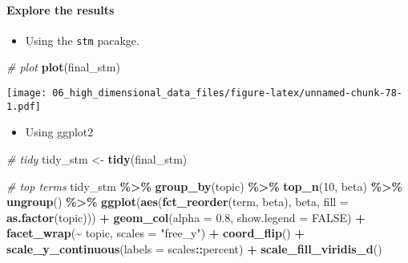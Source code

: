 \documentclass[
]{book}
\newenvironment{Shaded}{\begin{snugshade}}{\end{snugshade}}
\newcommand{\CommentTok}[1]{\textcolor[rgb]{0.56,0.35,0.01}{\textit{#1}}}
\newcommand{\DataTypeTok}[1]{\textcolor[rgb]{0.13,0.29,0.53}{#1}}
\newcommand{\DecValTok}[1]{\textcolor[rgb]{0.00,0.00,0.81}{#1}}
\newcommand{\FloatTok}[1]{\textcolor[rgb]{0.00,0.00,0.81}{#1}}
\newcommand{\KeywordTok}[1]{\textcolor[rgb]{0.13,0.29,0.53}{\textbf{#1}}}
\newcommand{\NormalTok}[1]{#1}
\newcommand{\OperatorTok}[1]{\textcolor[rgb]{0.81,0.36,0.00}{\textbf{#1}}}
\newcommand{\OtherTok}[1]{\textcolor[rgb]{0.56,0.35,0.01}{#1}}
\newcommand{\StringTok}[1]{\textcolor[rgb]{0.31,0.60,0.02}{#1}}
\providecommand{\tightlist}{%
  \setlength{\itemsep}{0pt}\setlength{\parskip}{0pt}}
\begin{document}
\hypertarget{explore-the-results}{%
\paragraph{Explore the results}\label{explore-the-results}}

\begin{itemize}
\tightlist
\item
  Using the \texttt{stm} pacakge.
\end{itemize}

\begin{Shaded}
\begin{Highlighting}[]
\CommentTok{\# plot}
\KeywordTok{plot}\NormalTok{(final\_stm)}
\end{Highlighting}
\end{Shaded}

\texttt{[image: 06\_high\_dimensional\_data\_files/figure-latex/unnamed-chunk-78-1.pdf]}

\begin{itemize}
\tightlist
\item
  Using ggplot2
\end{itemize}

\begin{Shaded}
\begin{Highlighting}[]
\CommentTok{\# tidy  }
\NormalTok{tidy\_stm \textless{}{-}}\StringTok{ }\KeywordTok{tidy}\NormalTok{(final\_stm)}

\CommentTok{\# top terms}
\NormalTok{tidy\_stm }\OperatorTok{\%\textgreater{}\%}
\StringTok{    }\KeywordTok{group\_by}\NormalTok{(topic) }\OperatorTok{\%\textgreater{}\%}
\StringTok{    }\KeywordTok{top\_n}\NormalTok{(}\DecValTok{10}\NormalTok{, beta) }\OperatorTok{\%\textgreater{}\%}
\StringTok{    }\KeywordTok{ungroup}\NormalTok{() }\OperatorTok{\%\textgreater{}\%}
\StringTok{    }\KeywordTok{ggplot}\NormalTok{(}\KeywordTok{aes}\NormalTok{(}\KeywordTok{fct\_reorder}\NormalTok{(term, beta), beta, }\DataTypeTok{fill =} \KeywordTok{as.factor}\NormalTok{(topic))) }\OperatorTok{+}
\StringTok{    }\KeywordTok{geom\_col}\NormalTok{(}\DataTypeTok{alpha =} \FloatTok{0.8}\NormalTok{, }\DataTypeTok{show.legend =} \OtherTok{FALSE}\NormalTok{) }\OperatorTok{+}
\StringTok{    }\KeywordTok{facet\_wrap}\NormalTok{(}\OperatorTok{\textasciitilde{}}\StringTok{ }\NormalTok{topic, }\DataTypeTok{scales =} \StringTok{"free\_y"}\NormalTok{) }\OperatorTok{+}
\StringTok{    }\KeywordTok{coord\_flip}\NormalTok{() }\OperatorTok{+}
\StringTok{    }\KeywordTok{scale\_y\_continuous}\NormalTok{(}\DataTypeTok{labels =}\NormalTok{ scales}\OperatorTok{::}\NormalTok{percent) }\OperatorTok{+}
\StringTok{    }\KeywordTok{scale\_fill\_viridis\_d}\NormalTok{()}
\end{Highlighting}
\end{Shaded}
\end{document}
